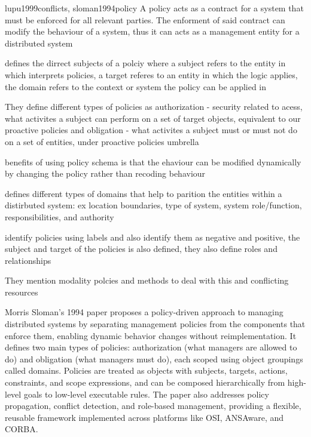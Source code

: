 



lupu1999conflicts, sloman1994policy
A policy acts as a contract for a system that must be enforced for all relevant parties. The enforment of said contract can modify the behaviour of a system, thus it can acts as a management entity for a distributed system \cite{lupu1999conflicts, }

\cite{lupu1999conflicts, sloman1994policy} defines the dirrect subjects of a polciy where a subject refers to the entity in which interprets policies, a target referes to an entity in which the logic applies, the domain refers to the context or system the policy can be applied in

They define different types of policies as authorization - security related to acess, what activites a subject can perform on a set of target objects, equivalent to our proactive policies and obligation - what activites a subject must or must not do on a set of entities, under proactive policies umbrella

benefits of using policy schema is that the ehaviour can be modified dynamically by changing the policy rather than recoding behaviour

defines different types of domains that help to parition the entities within a distirbuted system: ex location boundaries, type of system, system role/function, responsibilities, and authority

identify policies using labels and also identify them as negative and positive, the subject and target of the policies is also defined, they also define roles and relationships

They mention modality polcies and methods to deal with this and conflicting resources

Morris Sloman’s 1994 paper proposes a policy-driven approach to managing distributed systems by separating management policies from the components that enforce them, enabling dynamic behavior changes without reimplementation. It defines two main types of policies: authorization (what managers are allowed to do) and obligation (what managers must do), each scoped using object groupings called domains. Policies are treated as objects with subjects, targets, actions, constraints, and scope expressions, and can be composed hierarchically from high-level goals to low-level executable rules. The paper also addresses policy propagation, conflict detection, and role-based management, providing a flexible, reusable framework implemented across platforms like OSI, ANSAware, and CORBA.


